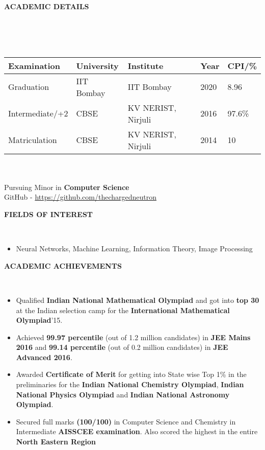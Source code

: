 \documentclass[a4paper,10pt]{article}
\newcommand{\lsep}{-0.5cm}
\newcommand{\resheading}[1]{{\small \colorbox{mygrey}{\begin{minipage}{0.975\textwidth}{\textbf{#1 \vphantom{p\^{E}}}}\end{minipage}}}}
\begin{document}
\hspace{0.5cm}\\[-0.2cm]

\indent  \\

\resheading{\textbf{ACADEMIC DETAILS} }\\[\lsep]
\\ \\
\indent \begin{tabular}{ l @{\hskip 0.5in} l @{\hskip 0.6in} l @{\hskip 0.75in} l @{\hskip 1in} l }
\hline
\textbf{Examination} & \textbf{University} & \textbf{Institute } & \textbf{Year} & \textbf{CPI/\%} \\
\hline
Graduation      & IIT Bombay & IIT Bombay & 2020 & 8.96 \\
Intermediate/+2 & CBSE & KV NERIST, Nirjuli   & 2016 & 97.6\%\\
Matriculation & CBSE & KV NERIST, Nirjuli & 2014 & 10\\
\hline
\end{tabular}
\\ \\
\indent \indent Pursuing Minor in \textbf{Computer Science} \\
\indent \indent GitHub - \href{https://github.com/thechargedneutron}{https://github.com/thechargedneutron}
\\

\resheading {\textbf{FIELDS OF INTEREST} }\\[\lsep]
\begin{itemize}
\item \noindent Neural Networks, Machine Learning, Information Theory, Image Processing
\end{itemize}

\resheading{\textbf{ACADEMIC ACHIEVEMENTS} }\\[\lsep]
\begin{itemize}
\setlength\itemsep{0.05em}
\item \noindent Qualified \textbf{Indian National Mathematical Olympiad} and got into \textbf{top 30} at the Indian selection camp for the \textbf{International Mathematical Olympiad}'15.
\item \noindent Achieved \textbf{99.97 percentile} (out of 1.2 million candidates) in \textbf{JEE Mains 2016} and \textbf{99.14 percentile} (out of 0.2 million candidates) in \textbf{JEE Advanced 2016}.
\item \noindent Awarded \textbf{Certificate of Merit} for getting into State wise Top 1\% in the preliminaries for the \textbf{Indian National Chemistry Olympiad}, \textbf{Indian National Physics Olympiad} and \textbf{Indian National Astronomy Olympiad}.
\item \noindent Secured full marks \textbf{(100/100)} in Computer Science and Chemistry in Intermediate \textbf{AISSCEE examination}. Also scored the highest in the entire \textbf{North Eastern Region}
\end{itemize}
\end{document}
